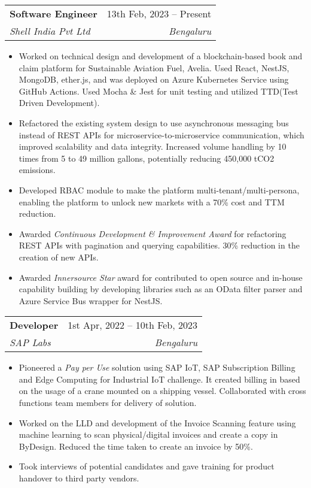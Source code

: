 \documentclass[letterpaper,11pt]{article}
\makeatletter
\newcommand{\resumeItem}[1]{
  \item\small{
    {#1 \vspace{-2pt}}
  }
}
\newcommand{\resumeSubheading}[4]{
  \vspace{-2pt}\item
    \begin{tabular*}{0.97\textwidth}[t]{l@{\extracolsep{\fill}}r}
      \textbf{#1} & #2 \\
      \textit{\small#3} & \textit{\small #4} \\
    \end{tabular*}\vspace{-7pt}
}
\newcommand{\resumeSubSubheading}[2]{
    \item
    \begin{tabular*}{0.97\textwidth}{l@{\extracolsep{\fill}}r}
      \textit{\small#1} & \textit{\small #2} \\
    \end{tabular*}\vspace{-7pt}
}
\newcommand{\resumeSubHeadingListEnd}{\end{itemize}}
\newcommand{\resumeItemListStart}{\begin{itemize}}
\newcommand{\resumeItemListEnd}{\end{itemize}\vspace{-5pt}}
\makeatother
\begin{document}
    \resumeSubheading
      {Software Engineer}{13th Feb, 2023 -- Present}
      {Shell India Pvt Ltd}{Bengaluru}
      \resumeItemListStart
        \resumeItem{Worked on technical design and development of a blockchain-based book and claim platform for Sustainable Aviation Fuel, Avelia. Used React, NestJS, MongoDB, ether.js, and was deployed on Azure Kubernetes Service using GitHub Actions. Used Mocha \& Jest for unit testing and utilized TTD(Test Driven Development).}
        \resumeItem{Refactored the existing system design to use asynchronous messaging bus instead of REST APIs for microservice-to-microservice communication, which improved scalability and data integrity. Increased volume handling by 10 times from 5 to 49 million gallons, potentially reducing 450,000 tCO2 emissions.}
        \resumeItem{Developed RBAC module to make the platform multi-tenant/multi-persona, enabling the platform to unlock new markets with a 70\% cost and TTM reduction.}
        \resumeItem{Awarded \emph{Continuous Development \& Improvement Award} for refactoring REST APIs with pagination and querying capabilities. 30\% reduction in the creation of new APIs. }
        \resumeItem{Awarded \emph{Innersource Star} award for contributed to open source and in-house capability building by developing libraries such as an OData filter parser and Azure Service Bus wrapper for NestJS.}
      \resumeItemListEnd
      

    \resumeSubheading
      {Developer}{1st Apr, 2022 -- 10th Feb, 2023}
      {SAP Labs}{Bengaluru}
      \resumeItemListStart
        \resumeItem{Pioneered a \emph{Pay per Use} solution using SAP IoT, SAP Subscription Billing and Edge Computing for Industrial IoT challenge. It created billing in based on the usage of a crane mounted on a shipping vessel. Collaborated with cross functions team members for delivery of solution.}
        \resumeItem{Worked on the LLD and development of the Invoice Scanning feature using machine learning to scan physical/digital invoices and create a copy in ByDesign. Reduced the time taken to create an invoice by 50\%.}
        \resumeItem{Took interviews of potential candidates and gave training for product handover to third party vendors.}
    \resumeItemListEnd
\end{document}

